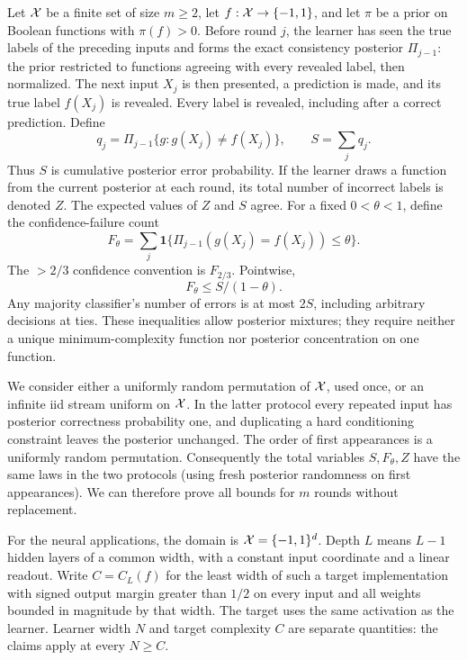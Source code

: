 \documentclass[11pt]{article}
\theoremstyle{remark}\newtheorem{remark}[theorem]{Remark}
\begin{document}
Let $\mathcal X$ be a finite set of size $m\ge2$, let
$f:\mathcal X\to\{-1,1\}$, and let $\pi$ be a prior on Boolean functions
with $\pi(f)>0$. Before round $j$, the learner has seen the true labels
of the preceding inputs and forms the exact consistency posterior
$\Pi_{j-1}$: the prior restricted to functions agreeing with every
revealed label, then normalized. The next input $X_j$ is then presented, a prediction is
made, and its true label $f(X_j)$ is revealed. Every label is revealed,
including after a correct prediction. Define
\[
 q_j=\Pi_{j-1}\{g:g(X_j)\ne f(X_j)\},\qquad
 S=\sum_j q_j.
\]
Thus $S$ is cumulative posterior error probability. If the learner draws
a function from the current posterior at each round, its total number of
incorrect labels is denoted $Z$. The expected values of $Z$ and $S$ agree.
For a fixed $0<\theta<1$, define the confidence-failure count
\[
 F_\theta=\sum_j\mathbf1\{\Pi_{j-1}(g(X_j)=f(X_j))\le\theta\}.
\]
The $>2/3$ confidence convention is $F_{2/3}$. Pointwise,
\begin{equation}\label{eq:confidence}
 F_\theta\le S/(1-\theta).
\end{equation}
Any majority classifier's number of errors is at most $2S$, including
arbitrary decisions at ties. These inequalities allow posterior mixtures;
they require neither a unique minimum-complexity function nor posterior
concentration on one function.

We consider either a uniformly random permutation of $\mathcal X$, used once,
or an infinite iid stream uniform on $\mathcal X$. In the latter protocol every
repeated input has posterior correctness probability one, and duplicating
a hard conditioning constraint leaves the posterior unchanged. The order
of first appearances is a uniformly random permutation. Consequently the
total variables $S,F_\theta,Z$ have the same laws in the two protocols
(using fresh posterior randomness on first appearances). We can therefore
prove all bounds for $m$ rounds without replacement.

For the neural applications, the domain is $\mathcal X=\{-1,1\}^d$.
Depth $L$ means $L-1$ hidden layers of a common width, with a constant
input coordinate and a linear readout. Write $C=C_L(f)$ for the least
width of such a target implementation with signed output margin greater
than $1/2$ on every input and all weights bounded in magnitude by that
width. The target uses the same activation as the learner. Learner width
$N$ and target complexity $C$ are separate quantities: the claims apply
at every $N\ge C$.
\end{document}
